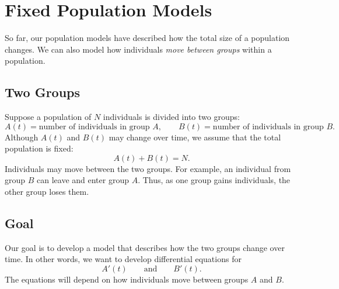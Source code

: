\documentclass[09pt,letterpaper]{article}
\begin{document}
\section{Fixed Population Models}
So far, our population models have described how the total size of a
population changes. We can also model how individuals \textit{move between
groups} within a population.


\subsection{Two Groups}


Suppose a population of $N$ individuals is divided into two groups:
\[
A(t)=\text{number of individuals in group $A$},
\qquad
B(t)=\text{number of individuals in group $B$}.
\]
Although $A(t)$ and $B(t)$ may change over time, we assume that the total population is fixed:
\[
A(t)+B(t)=N.
\]
Individuals may move between the two groups. For example, an individual from group $B$ can leave and enter group $A$. Thus, as one group gains individuals, the other group loses them.

\subsection{Goal}

Our goal is to develop a model that describes how the two groups change over
time. In other words, we want to develop differential equations for
\[
A'(t)
\qquad\text{and}\qquad
B'(t).
\]
The equations will depend on how individuals move between groups $A$ and $B$.
\end{document}
